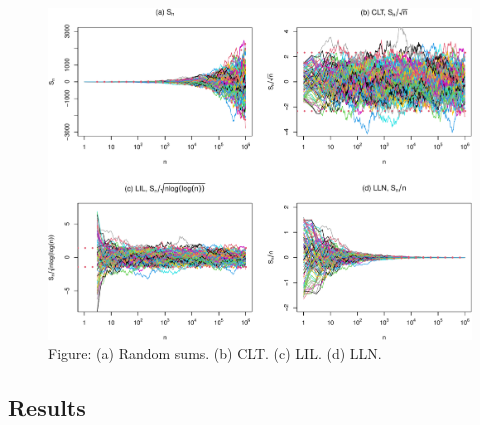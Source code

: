 \documentclass[
  letterpaper,
  DIV=11,
  numbers=noendperiod]{scrreprt}
\theoremstyle{definition}
\theoremstyle{plain}
\theoremstyle{plain}
\theoremstyle{definition}
\theoremstyle{plain}
\theoremstyle{definition}
\theoremstyle{remark}
\begin{document}
\begin{figure}[H]

{\centering \includegraphics[width=0.7\linewidth,height=\textheight,keepaspectratio]{lil_files/figure-pdf/unnamed-chunk-2-1.pdf}

}

\caption{Figure: (a) Random sums. (b) CLT. (c) LIL. (d) LLN.}

\end{figure}%

\subsection{Results}\label{results}
\end{document}
